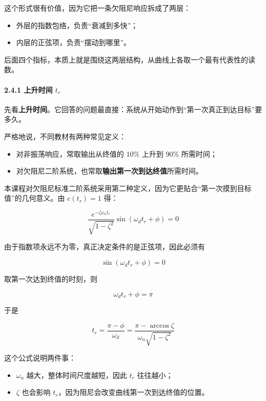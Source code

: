 \documentclass[
  11pt]{article}
\providecommand{\tightlist}{%
  \setlength{\itemsep}{0pt}\setlength{\parskip}{0pt}}
\begin{document}
这个形式很有价值，因为它把一条欠阻尼响应拆成了两层：

\begin{itemize}
\tightlist
\item
  外层的指数包络，负责``衰减到多快''；
\item
  内层的正弦项，负责``摆动到哪里''。
\end{itemize}

后面四个指标，本质上就是围绕这两层结构，从曲线上各取一个最有代表性的读数。

\paragraph{\texorpdfstring{2.4.1 上升时间
\(t_r\)}{2.4.1 上升时间 t\_r}}\label{ux4e0aux5347ux65f6ux95f4-t_r}

先看\textbf{上升时间}。它回答的问题最直接：系统从开始动作到``第一次真正到达目标''要多久。

严格地说，不同教材有两种常见定义：

\begin{itemize}
\tightlist
\item
  对非振荡响应，常取输出从终值的 10\% 上升到 90\% 所需时间；
\item
  对欠阻尼二阶系统，也常取\textbf{输出第一次到达终值}所需时间。
\end{itemize}

本课程对欠阻尼标准二阶系统采用第二种定义，因为它更贴合``第一次摸到目标值''的几何意义。由
\(c(t_r)=1\) 得：

\[
\frac{e^{-\zeta\omega_n t_r}}{\sqrt{1-\zeta^2}}\sin(\omega_d t_r + \phi) = 0
\]

由于指数项永远不为零，真正决定条件的是正弦项，因此必须有

\[
\sin(\omega_d t_r + \phi) = 0
\]

取第一次达到终值的时刻，则

\[
\omega_d t_r + \phi = \pi
\]

于是

\[
t_r = \frac{\pi - \phi}{\omega_d} = \frac{\pi - \arccos \zeta}{\omega_n\sqrt{1-\zeta^2}}
\]

这个公式说明两件事：

\begin{itemize}
\tightlist
\item
  \(\omega_n\) 越大，整体时间尺度越短，因此 \(t_r\) 往往越小；
\item
  \(\zeta\) 也会影响 \(t_r\)，因为阻尼会改变曲线第一次到达终值的位置。
\end{itemize}
\end{document}

